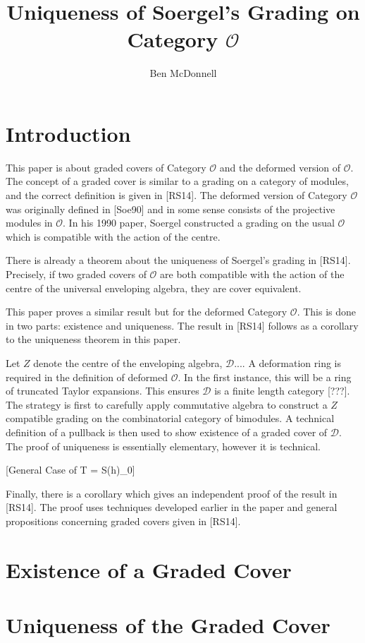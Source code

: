 \documentclass[12pt,amstex,amssymb,amscd]{amsart}
\theoremstyle{remark}
\newcommand{\mc}{\mathcal}
\begin{document}
	\title{Uniqueness of Soergel's Grading on Category $\mc{O}$}
	\author{Ben McDonnell}
	\date{}
	\maketitle
	
	\section{Introduction}
	This paper is about graded covers of Category $\mc{O}$ and the deformed version of $\mc{O}$. The concept of a graded cover is similar to a grading on a category of modules, and the correct definition is given in [RS14]. The deformed version of Category $\mc{O}$ was originally defined in [Soe90] and in some sense consists of the projective modules in $\mc{O}$. In his 1990 paper, Soergel constructed a grading on the usual $\mc{O}$ which is compatible with the action of the centre.
	
	There is already a theorem about the uniqueness of Soergel's grading in [RS14]. Precisely, if two graded covers of $\mc{O}$ are both compatible with the action of the centre of the universal enveloping algebra, they are cover equivalent.
	
	This paper proves a similar result but for the deformed Category $\mc{O}$. This is done in two parts: existence and uniqueness. The result in [RS14] follows as a corollary to the uniqueness theorem in this paper.
	
	Let $Z$ denote the centre of the enveloping algebra, $\mc{D}$....
	A deformation ring is required in the definition of deformed $\mc{O}$. In the first instance, this will be a ring of truncated Taylor expansions. This ensures $\mc{D}$ is a finite length category [???]. The strategy is first to carefully apply commutative algebra to construct a $Z$ compatible grading on the combinatorial category of bimodules. A technical definition of a pullback is then used to show existence of a graded cover of $\mc{D}$. The proof of uniqueness is essentially elementary, however it is technical.
	
	[General Case of T = S(h)_0]
	
	Finally, there is a corollary which gives an independent proof of the result in [RS14]. The proof uses techniques developed earlier in the paper and general propositions concerning graded covers given in [RS14].
	\section{Existence of a Graded Cover}
	
	\section{Uniqueness of the Graded Cover}
\end{document}
